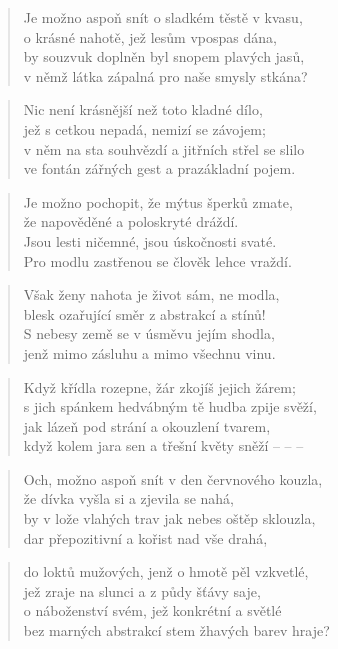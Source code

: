 \documentclass{book}
\begin{document}
\begin{verse}
Je možno aspoň snít o sladkém těstě v kvasu,\\
o krásné nahotě, jež lesům vpospas dána,\\
by souzvuk doplněn byl snopem plavých jasů,\\
v němž látka zápalná pro naše smysly stkána?
\end{verse}
\begin{verse}
Nic není krásnější než toto kladné dílo,\\
jež s cetkou nepadá, nemizí se závojem;\\
v něm na sta souhvězdí a jitřních střel se slilo\\
ve fontán zářných gest a prazákladní pojem.
\end{verse}
\begin{verse}
Je možno pochopit, že mýtus šperků zmate,\\
že napověděné a poloskryté dráždí.\\
Jsou lesti ničemné, jsou úskočnosti svaté.\\
Pro modlu zastřenou se člověk lehce vraždí.
\end{verse}
\begin{verse}
Však ženy nahota je život sám, ne modla,\\
blesk ozařující směr z abstrakcí a stínů!\\
S nebesy země se v úsměvu jejím shodla,\\
jenž mimo zásluhu a mimo všechnu vinu.
\end{verse}
\begin{verse}
Když křídla rozepne, žár zkojíš jejich žárem;\\
s jich spánkem hedvábným tě hudba zpije svěží,\\
jak lázeň pod strání a okouzlení tvarem,\\
když kolem jara sen a třešní květy sněží -- -- --
\end{verse}
\begin{verse}
Och, možno aspoň snít v den červnového kouzla,\\
že dívka vyšla si a zjevila se nahá,\\
by v lože vlahých trav jak nebes oštěp sklouzla,\\
dar přepozitivní a kořist nad vše drahá,
\end{verse}
\begin{verse}
do loktů mužových, jenž o hmotě pěl vzkvetlé,\\
jež zraje na slunci a z půdy šťávy saje,\\
o náboženství svém, jež konkrétní a světlé\\
bez marných abstrakcí stem žhavých barev hraje?
\end{verse}
\end{document}
